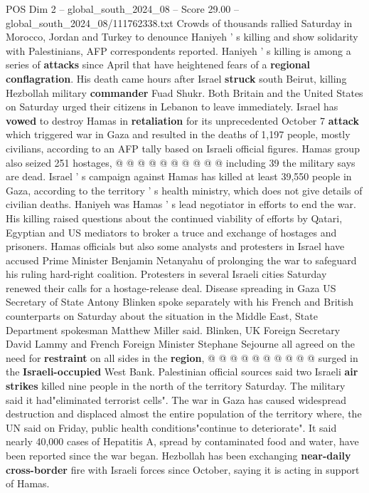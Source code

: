 \begin{textsample}{POS Dim 2 – global\_south\_2024\_08 – Score 29.00 – global\_south\_2024\_08/111762338.txt}
Crowds of thousands rallied Saturday in Morocco, Jordan and Turkey to denounce Haniyeh ' s killing and show solidarity with Palestinians, AFP correspondents reported.
Haniyeh ' s killing is among a series of \textbf{attacks} since April that have heightened fears of a \textbf{regional} \textbf{conflagration}.
His death came hours after Israel \textbf{struck} south Beirut, killing Hezbollah military \textbf{commander} Fuad Shukr.
Both Britain and the United States on Saturday urged their citizens in Lebanon to leave immediately.
Israel has \textbf{vowed} to destroy Hamas in \textbf{retaliation} for its unprecedented October 7 \textbf{attack} which triggered war in Gaza and resulted in the deaths of 1,197 people, mostly civilians, according to an AFP tally based on Israeli official figures.
Hamas group also seized 251 hostages, @ @ @ @ @ @ @ @ @ @ including 39 the military says are dead.
Israel ' s campaign against Hamas has killed at least 39,550 people in Gaza, according to the territory ' s health ministry, which does not give details of civilian deaths.
Haniyeh was Hamas ' s lead negotiator in efforts to end the war.
His killing raised questions about the continued viability of efforts by Qatari, Egyptian and US mediators to broker a truce and exchange of hostages and prisoners.
Hamas officials but also some analysts and protesters in Israel have accused Prime Minister Benjamin Netanyahu of prolonging the war to safeguard his ruling hard-right coalition.
Protesters in several Israeli cities Saturday renewed their calls for a hostage-release deal.
Disease spreading in Gaza US Secretary of State Antony Blinken spoke separately with his French and British counterparts on Saturday about the situation in the Middle East, State Department spokesman Matthew Miller said.
Blinken, UK Foreign Secretary David Lammy and French Foreign Minister Stephane Sejourne all agreed on the need for \textbf{restraint} on all sides in the \textbf{region}, @ @ @ @ @ @ @ @ @ @ surged in the \textbf{Israeli-occupied} West Bank.
Palestinian official sources said two Israeli \textbf{air} \textbf{strikes} killed nine people in the north of the territory Saturday.
The military said it had"eliminated terrorist cells".
The war in Gaza has caused widespread destruction and displaced almost the entire population of the territory where, the UN said on Friday, public health conditions"continue to deteriorate".
It said nearly 40,000 cases of Hepatitis A, spread by contaminated food and water, have been reported since the war began.
Hezbollah has been exchanging \textbf{near-daily} \textbf{cross-border} fire with Israeli forces since October, saying it is acting in support of Hamas.

\end{textsample}
